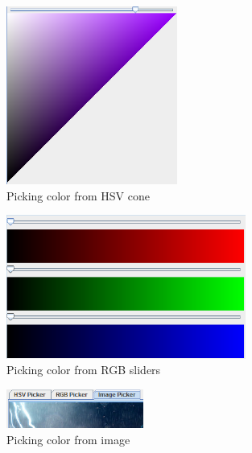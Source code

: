 \documentclass[titlepage]{article}
\begin{document}
\begin{figure}[!htb]
	\centering
	\includegraphics[width=0.5\textwidth]{img/hsvpick.png} 
	\caption{Picking color from HSV cone}
\end{figure}


\begin{figure}[!htb]
	\centering
	\includegraphics[width=0.7\textwidth]{img/rgbpick.png} 
	\caption{Picking color from RGB sliders}
\end{figure}


\begin{figure}[!htb]
	\centering
	\includegraphics[width=0.4\textwidth]{img/imagepick.png}
	\caption{Picking color from image} 
\end{figure}
\end{document}
